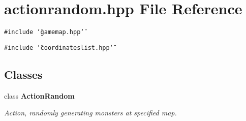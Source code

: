 \section{actionrandom.hpp File Reference}
\label{actionrandom_8hpp}
{\tt \#include \char`\"{}gamemap.hpp\char`\"{}}\par
{\tt \#include \char`\"{}coordinateslist.hpp\char`\"{}}\par
\subsection*{Classes}
\begin{CompactItemize}
\item 
class {\bf Action\-Random}
\begin{CompactList}\small\item\em Action, randomly generating monsters at specified map. \item\end{CompactList}\end{CompactItemize}
